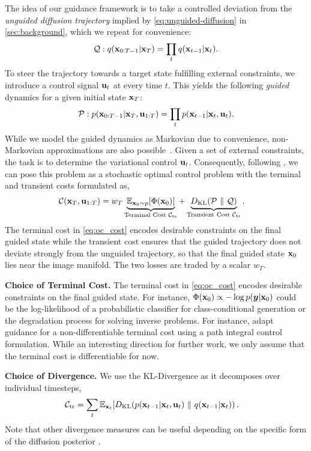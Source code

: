 The idea of our guidance framework is to take a controlled deviation from the \textit{unguided diffusion trajectory} implied by \cref{eq:unguided-diffusion} in \cref{sec:background}, which we repeat for convenience:
\begin{equation}
{\mathcal{Q}}: q({\mathbf{x}}_{0:T-1}|{\mathbf{x}}_T) = \prod_{t} q({\mathbf{x}}_{t-1}|{\mathbf{x}}_t).
\end{equation}
To steer the trajectory towards a target state fulfilling external constraints, we introduce a control signal ${\mathbf{u}}_t$ at every time $t$. This yields the following \emph{guided} dynamics for a given initial state ${\mathbf{x}}_T$:
\begin{equation}
{\mathcal{P}}: p({\mathbf{x}}_{0:T-1}|{\mathbf{x}}_T, {\mathbf{u}}_{1:T}) = \prod_{t} p({\mathbf{x}}_{t-1}|{\mathbf{x}}_t, {\mathbf{u}}_t).
\label{eq:guided}
\end{equation}
While we model the guided dynamics as Markovian due to convenience, non-Markovian approximations are also possible~\citep{li2021detecting}. Given a set of external constraints, the task is to determine the variational control ${\mathbf{u}}_t$. Consequently, following \citet{Kappen_2012}, we can pose this problem as a stochastic optimal control problem with the terminal and transient costs formulated as,
\begin{align}
{\mathcal{C}}({\mathbf{x}}_T, {\mathbf{u}}_{1:T}) &= w_T\underbrace{\mathbb{E}_{{\mathbf{x}}_0 \sim p}[\Phi({\mathbf{x}}_0)]}_{\text{Terminal Cost } {\mathcal{C}}_\text{te}} + \underbrace{D_{\mathrm{KL}}\!\left({\mathcal{P}} ~ \| ~ {\mathcal{Q}}\right)}_{\text{Transient Cost } {\mathcal{C}}_\text{tr}}.
\label{eq:oc_cost}
\end{align}
The terminal cost in \cref{eq:oc_cost} encodes desirable constraints on the final guided state while the transient cost ensures that the guided trajectory does not deviate strongly from the unguided trajectory, so that the final guided state ${\mathbf{x}}_0$ lies near the image manifold. The two losses are traded by a scalar $w_T$.

\textbf{Choice of Terminal Cost.} 
The terminal cost in \cref{eq:oc_cost} encodes desirable constraints on the final guided state. For instance, $\Phi({\mathbf{x}}_0) \propto -\log p({\bm{y}}|{\mathbf{x}}_0)$ could be the log-likelihood of a probabilistic classifier for class-conditional generation or the degradation process for solving inverse problems. For instance, \citet{HuangGLHZSGOY24} adapt guidance for a non-differentiable terminal cost using a path integral control \citep{Kappen_2005} formulation. While an interesting direction for further work, we only assume that the terminal cost is differentiable for now.


\textbf{Choice of Divergence.} We use the KL-Divergence as it decomposes over individual timesteps,
\begin{align}
{\mathcal{C}}_\text{tr} 
&= \sum_t \mathbb{E}_{{\mathbf{x}}_t}[D_{\mathrm{KL}}\!\left(p({\mathbf{x}}_{t-1}|{\mathbf{x}}_t, {\mathbf{u}}_t) ~ \| ~ q({\mathbf{x}}_{t-1}|{\mathbf{x}}_t)\right).
\label{eq:oc_cost_simple}
\end{align}
Note that other divergence measures can be useful depending on the specific form of the diffusion posterior \citep{nachmani2021denoisingdiffusiongammamodels, zhou2023betadiffusion, pandey2024heavytaileddiffusionmodels, holderrieth2024generatormatchinggenerativemodeling}.

